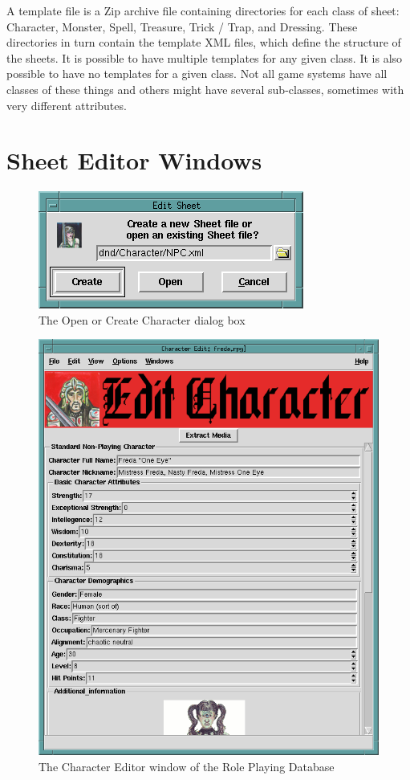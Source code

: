 A template file is a Zip archive file containing directories for each
class of sheet: Character, Monster, Spell, Treasure, Trick / Trap, and
Dressing.  These directories in turn contain the template XML files,
which define the structure of the sheets.  It is possible to have
multiple templates for any given class.  It is also possible to have no
templates for a given class.  Not all game systems have all classes of
these things and others might have several sub-classes, sometimes with
very different attributes.

\section{Sheet Editor Windows}
\label{SheetEditor}

\begin{figure}[hbpt]
\begin{centering}
\includegraphics{CreateOrOpenChar.png}
\caption{The Open or Create Character dialog box}
\label{fig:opencreatechar}
\end{centering}
\end{figure}
\begin{figure}[hbpt] 
\begin{centering}
\includegraphics[width=5in]{CharacterEditor.png} 
\caption{The Character Editor window of the Role Playing Database} 
\label{fig:char}
\end{centering} 
\end{figure} 
